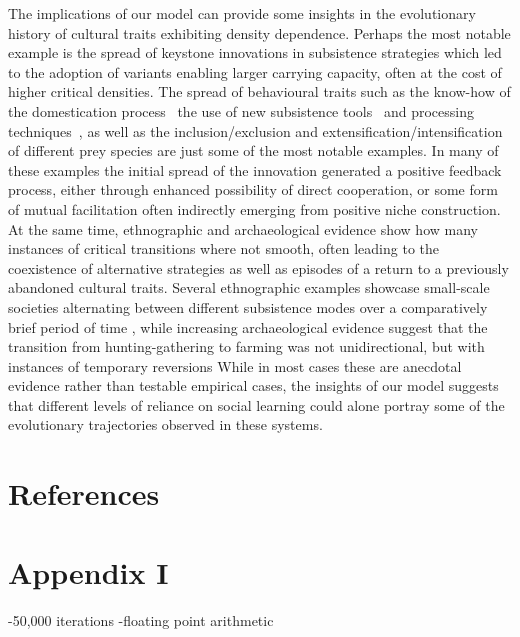 \documentclass[review,authoryear]{elsarticle}
\begin{document}
The implications of our model can provide some insights in the evolutionary history of cultural traits exhibiting density dependence. Perhaps the most notable example is the spread of keystone innovations in subsistence strategies which led to the adoption of variants enabling larger carrying capacity, often at the cost of higher critical densities. The spread of behavioural traits such as the know-how of the domestication process~\citep{barker2006} the use of new subsistence tools~\citep{petraglia_population_2009} and processing techniques~\citep{molleson1993}, as well as the inclusion/exclusion and extensification/intensification of different prey species are just some of the most notable examples. In many of these examples the initial spread of the innovation generated a positive feedback process, either through enhanced possibility of direct cooperation, or some form of mutual facilitation often indirectly emerging from positive niche construction. At the same time, ethnographic and archaeological evidence show how many instances of critical transitions where not smooth, often leading to the coexistence of alternative strategies as well as episodes of a return to a previously abandoned cultural traits. Several ethnographic examples showcase small-scale societies alternating between different subsistence modes over a comparatively brief period of time \citep{layton1991,mace_1993,oota_et_al_2005}, while increasing archaeological evidence suggest that the transition from hunting-gathering to farming was not unidirectional, but with instances of temporary reversions \citep{rowley2001,stevens_fuller_2012} %
While in most cases these are anecdotal evidence rather than testable empirical cases, the insights of our model suggests that different levels of reliance on social learning could alone portray some of the evolutionary trajectories observed in these systems. 

\section{References}




\section{Appendix I}

-50,000 iterations
-floating point arithmetic
\end{document}

